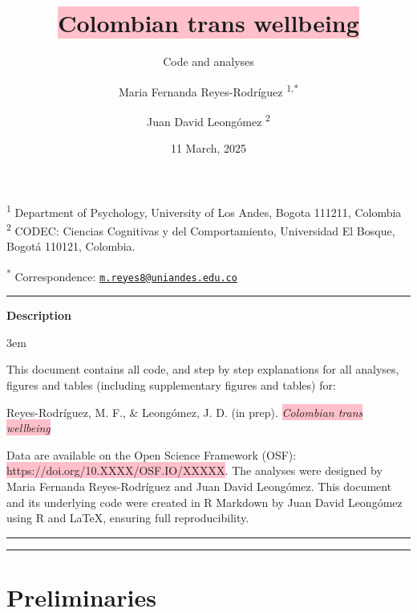 \documentclass[
  bookmarksnumbered]{article}
\title{\colorbox{pink}{Colombian trans wellbeing}}
\subtitle{Code and analyses}
\author{Maria Fernanda Reyes-Rodríguez \orcidlink{0000-0002-2645-5092}\textsuperscript{1,*} \and Juan David Leongómez \orcidlink{0000-0002-0092-6298}\textsuperscript{2}}
\date{11 March, 2025}
\begin{document}
\maketitle

\textsuperscript{1} Department of Psychology, University of Los Andes, Bogota 111211, Colombia\\
\textsuperscript{2} CODEC: Ciencias Cognitivas y del Comportamiento, Universidad El Bosque, Bogotá 110121, Colombia.

\textsuperscript{*} Correspondence: \href{mailto:m.reyes8@uniandes.edu.co}{\href{mailto:m.reyes8@uniandes.edu.co}{\nolinkurl{m.reyes8@uniandes.edu.co}}}

\begin{center}\rule{0.5\linewidth}{0.5pt}\end{center}

\begin{center}
\textbf{Description}
\end{center}

\par
\begingroup
\leftskip3em
\rightskip\leftskip

This document contains all code, and step by step explanations for all analyses, figures and tables (including supplementary figures and tables) for:

\begin{hangparas}{.25in}{1}
Reyes-Rodríguez, M. F., \&  Leongómez, J. D. (in prep). \textit{\colorbox{pink}{Colombian trans wellbeing}}
\end{hangparas}

Data are available on the Open Science Framework (OSF): \colorbox{pink}{https://doi.org/10.XXXX/OSF.IO/XXXXX}. The analyses were designed by Maria Fernanda Reyes-Rodríguez and Juan David Leongómez. This document and its underlying code were created in R Markdown by Juan David Leongómez using R and \LaTeX, ensuring full reproducibility.

\begin{center}\rule{0.5\linewidth}{0.5pt}\end{center}

\par
\endgroup

{\hypersetup{hidelinks}
\setcounter{tocdepth}{6}
\tableofcontents
}
\opensupplement

\begin{center}\rule{0.5\linewidth}{0.5pt}\end{center}

\section{Preliminaries}\label{preliminaries}
\end{document}
